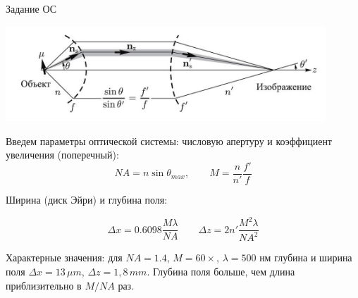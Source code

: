 \documentclass[9pt, compress, xcolor=table]{beamer}
\begin{document}
\begin{frame}{Задание ОС}

\begin{center}
\includegraphics[width=0.9\textwidth]{fig4_01}
\end{center}

{\small Введем параметры оптической системы: числовую апертуру и коэффициент увеличения
(поперечный):}
\begin{equation*}
NA = n \sin \theta_{max},\qquad M = \frac{n}{n'} \frac{f'}{f}
\end{equation*}

{\small Ширина (диск Эйри) и глубина поля:}

\begin{equation*}
\Delta x = 0.6098 \frac{M \lambda}{NA}\qquad \Delta z = 2 n'\frac{M^2 \lambda}{NA^2}
\end{equation*}

{\small Характерные значения: для $NA = 1.4$, $M = 60\times$, $\lambda = 500$ нм глубина и ширина
поля $\Delta x = 13\,\mu m$, $\Delta z = 1,8\,mm$. Глубина поля больше, чем длина приблизительно в $M/NA$ раз.}
\end{frame}
\end{document}
